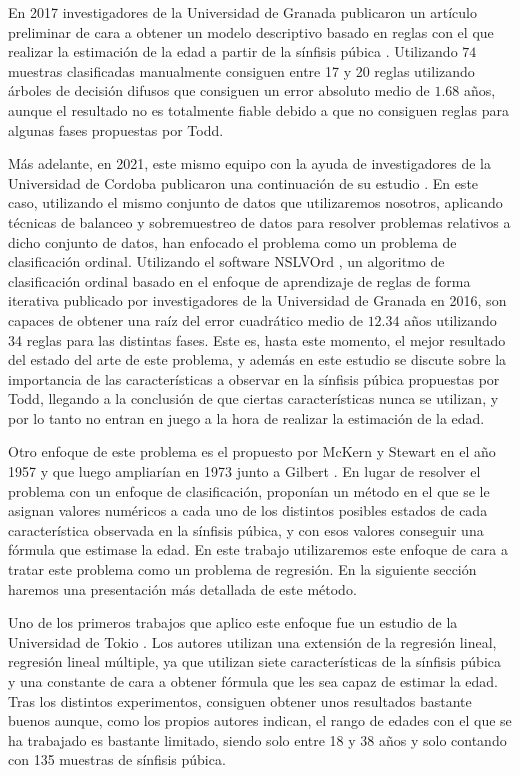 En 2017 investigadores de la Universidad de Granada publicaron un artículo preliminar de cara a obtener un modelo descriptivo basado en reglas con el que realizar la estimación de la edad a partir de la sínfisis púbica \cite{fuzzyAgeEstimation}. Utilizando $74$ muestras clasificadas manualmente consiguen entre 17 y 20 reglas utilizando árboles de decisión difusos que consiguen un error absoluto medio de $1.68$ años, aunque el resultado no es totalmente fiable debido a que no consiguen reglas para algunas fases propuestas por Todd.

Más adelante, en 2021, este mismo equipo con la ayuda de investigadores de la Universidad de Cordoba publicaron una continuación de su estudio \cite{NSLVOrdAge}. En este caso, utilizando el mismo conjunto de datos que utilizaremos nosotros, aplicando técnicas de balanceo y sobremuestreo de datos para resolver problemas relativos a dicho conjunto de datos, han enfocado el problema como un problema de clasificación ordinal. Utilizando el software NSLVOrd \cite{NSLVOrd}, un algoritmo de clasificación ordinal basado en el enfoque de aprendizaje de reglas de forma iterativa publicado por investigadores de la Universidad de Granada en 2016, son capaces de obtener una raíz del error cuadrático medio de $12.34$ años utilizando 34 reglas para las distintas fases. Este es, hasta este momento, el mejor resultado del estado del arte de este problema, y además en este estudio se discute sobre la importancia de las características a observar en la sínfisis púbica propuestas por Todd, llegando a la conclusión de que ciertas características nunca se utilizan, y por lo tanto no entran en juego a la hora de realizar la estimación de la edad.



Otro enfoque de este problema es el propuesto por McKern y Stewart en el año 1957 \cite{primeraPropuestaMcKern} y que luego ampliarían en 1973 junto a Gilbert \cite{propuestaGilbert}. En lugar de resolver el problema con un enfoque de clasificación, proponían un método en el que se le asignan valores numéricos a cada uno de los distintos posibles estados de cada característica observada en la sínfisis púbica, y con esos valores conseguir una fórmula que estimase la edad. En este trabajo utilizaremos este enfoque de cara a tratar este problema como un problema de regresión. En la siguiente sección haremos una presentación más detallada de este método.

Uno de los primeros trabajos que aplico este enfoque fue un estudio de la Universidad de Tokio \cite{primerTrabajoGilbert}. Los autores utilizan una extensión de la regresión lineal, regresión lineal múltiple, ya que utilizan siete características de la sínfisis púbica y una constante de cara a obtener fórmula que les sea capaz de estimar la edad. Tras los distintos experimentos, consiguen obtener unos resultados bastante buenos aunque, como los propios autores indican, el rango de edades con el que se ha trabajado es bastante limitado, siendo solo entre 18 y 38 años y solo contando con 135 muestras de sínfisis púbica.

